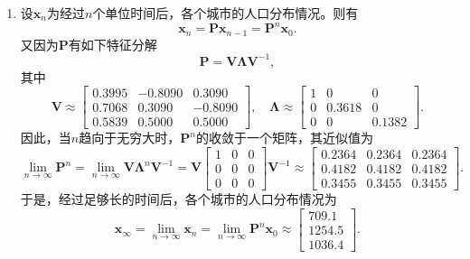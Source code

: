 \begin{solution}
\begin{enumerate}
        \item 设\( \bm{x}_n \)为经过\( n \)个单位时间后，各个城市的人口分布情况。则有
              \[
                  \bm{x}_n = \mathbf{P} \bm{x}_{n-1} = \mathbf{P}^n \bm{x}_0.
              \]
              又因为\( \mathbf{P} \)有如下特征分解
              \[
                  \mathbf{P} = \mathbf{V} \mathbf{\Lambda} \mathbf{V}^{-1},
              \]
              其中
              \[
                  \mathbf{V} \approx
                  \begin{bmatrix}
                      0.3995 & -0.8090 & 0.3090  \\
                      0.7068 & 0.3090  & -0.8090 \\
                      0.5839 & 0.5000  & 0.5000
                  \end{bmatrix}, \quad \mathbf{\Lambda} \approx
                  \begin{bmatrix}
                      1 & 0      & 0      \\
                      0 & 0.3618 & 0      \\
                      0 & 0      & 0.1382
                  \end{bmatrix}.
              \]
              因此，当\( n \)趋向于无穷大时，\( \mathbf{P}^n \)的收敛于一个矩阵，其近似值为
              \[
                  \lim_{n \to \infty} \mathbf{P}^n = \lim_{n \to \infty} \mathbf{V} \mathbf{\Lambda}^n \mathbf{V}^{-1} = \mathbf{V}
                  \begin{bmatrix}
                      1 & 0 & 0 \\
                      0 & 0 & 0 \\
                      0 & 0 & 0
                  \end{bmatrix} \mathbf{V}^{-1} \approx
                  \begin{bmatrix}
                      0.2364 & 0.2364 & 0.2364 \\
                      0.4182 & 0.4182 & 0.4182 \\
                      0.3455 & 0.3455 & 0.3455
                  \end{bmatrix}.
              \]
              于是，经过足够长的时间后，各个城市的人口分布情况为
              \[
                  \bm{x}_\infty = \lim_{n \to \infty} \bm{x}_n = \lim_{n \to \infty} \mathbf{P}^n \bm{x}_0 \approx
                  \begin{bmatrix}
                      709.1  \\
                      1254.5 \\
                      1036.4
                  \end{bmatrix}.
              \]

    \end{enumerate}
\end{solution}

